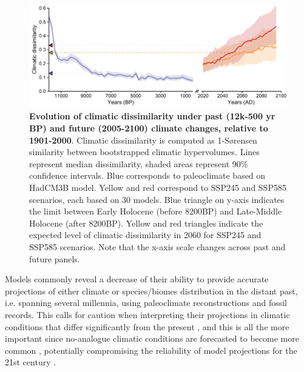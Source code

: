 \documentclass[pdflatex, sn-nature]{sn-jnl}%
\begin{document}
\begin{figure}[ht]
\centering
\hspace*{-0.6in}
\includegraphics[scale=1]{climatic_dissimilarity.pdf}
\caption{\textbf{Evolution of climatic dissimilarity under past (12k-500 yr BP) and future (2005-2100) climate changes, relative to 1901-2000}. Climatic dissimilarity is computed as 1-Sørensen similarity between bootstrapped climatic hypervolumes. Lines represent median dissimilarity, shaded areas represent 90\% confidence intervals. Blue corresponds to paleoclimate based on HadCM3B model. Yellow and red correspond to SSP245 and SSP585 scenarios, each based on 30 models. Blue triangle on y-axis indicates the limit between Early Holocene (before 8200BP) and Late-Middle Holocene (after 8200BP). Yellow and red triangles indicate the expected level of climatic dissimilarity in 2060 for SSP245 and SSP585 scenarios. Note that the x-axis scale changes across past and future panels.}\label{climatic_dissimilarity}
\end{figure}

Models commonly reveal a decrease of their ability to provide accurate projections of either climate \cite{Harrison2015} or species/biomes distribution \cite{Veloz2012, Pearman2008, Roberts2012, Foley2013} in the distant past, i.e. spanning several millennia, using paleoclimate reconstructions and fossil records. This calls for caution when interpreting their projections in climatic conditions that differ significantly from the present \cite{Maguire2016}, and this is all the more important since no-analogue climatic conditions are forecasted to become more common \cite{Williams2007}, potentially compromising the reliability of model projections for the 21st century \cite{Fitzpatrick2018}.
\end{document}
